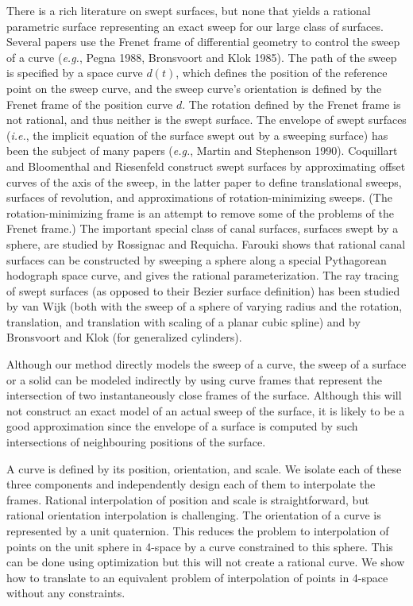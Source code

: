 There is a rich literature on swept surfaces, but none
that yields a rational parametric surface
representing an exact sweep for our large class of surfaces.
Several papers use the Frenet frame of differential geometry
to control the sweep of a curve ({\em e.g.}, Pegna 1988,
Bronsvoort and Klok 1985).
The path of the sweep is specified by a space curve $d(t)$,
which defines the position of the reference point on the
sweep curve, and the sweep curve's orientation is defined by
the Frenet frame of the position curve $d$.
The rotation defined by the Frenet frame is not rational,
and thus neither is the swept surface.  
The envelope of swept surfaces ({\em i.e.}, the implicit equation of the surface
swept out by a sweeping surface) has been the subject of many papers
({\em e.g.}, Martin and Stephenson 1990).
Coquillart and Bloomenthal and Riesenfeld 
construct swept surfaces by approximating offset curves
of the axis of the sweep, in the latter paper to define translational sweeps,
surfaces of revolution, and approximations of rotation-minimizing sweeps.
(The rotation-minimizing frame 
is an attempt to remove some of the problems of the Frenet frame.)
The important special class of canal surfaces, 
surfaces swept by a sphere, are studied by Rossignac and Requicha.
Farouki shows that rational canal surfaces can be constructed by sweeping
a sphere along a special Pythagorean hodograph space curve, and gives the
rational parameterization.
The ray tracing of swept surfaces (as opposed to their Bezier surface 
definition) has been studied by van Wijk (both with the sweep of a sphere
of varying radius and the rotation, translation,
and translation with scaling of a planar cubic spline)
and by Bronsvoort and Klok (for generalized cylinders).

Although our method directly models the sweep of a curve,
the sweep of a surface or a solid can be modeled indirectly
by using curve frames that represent the intersection of two 
instantaneously close frames of the surface.
Although this will not construct an 
exact model of an actual sweep of the surface,
it is likely to be a good approximation since the 
envelope of a surface is computed by such intersections
of neighbouring positions of the surface.

A curve is defined by its position, orientation, and scale.
We isolate each of these three components and independently 
design each of them to interpolate the frames.
Rational interpolation of position and scale is straightforward, 
but rational orientation interpolation is challenging.
The orientation of a curve is represented by a unit quaternion.
This reduces the problem to interpolation of points on the unit
sphere in 4-space by a curve constrained to this sphere.
This can be done using optimization but this will not create
a rational curve.
We show how to translate to an equivalent problem of interpolation
of points in 4-space without any constraints.

